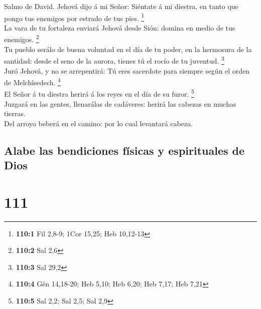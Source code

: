  Salmo de David. Jehová dijo á mi Señor: Siéntate á mi
diestra, en tanto que pongo tus enemigos por estrado de tus pies.
\footnote{\textbf{110:1} Fil 2,8-9; 1Cor 15,25; Heb 10,12-13}\\
 La vara de tu fortaleza enviará Jehová desde Sión: domina
en medio de tus enemigos. \footnote{\textbf{110:2} Sal 2,6}\\
 Tu pueblo serálo de buena voluntad en el día de tu poder,
en la hermosura de la santidad: desde el seno de la aurora, tienes tú el
rocío de tu juventud. \footnote{\textbf{110:3} Sal 29,2}\\
 Juró Jehová, y no se arrepentirá: Tú eres sacerdote para
siempre según el orden de Melchîsedech. \footnote{\textbf{110:4} Gén
  14,18-20; Heb 5,10; Heb 6,20; Heb 7,17; Heb 7,21}\\
 El Señor á tu diestra herirá á los reyes en el día de su
furor. \footnote{\textbf{110:5} Sal 2,2; Sal 2,5; Sal 2,9}\\
 Juzgará en las gentes, llenarálas de cadáveres: herirá las
cabezas en muchas tierras.\\
 Del arroyo beberá en el camino: por lo cual levantará
cabeza.

\hypertarget{alabe-las-bendiciones-fuxedsicas-y-espirituales-de-dios}{%
\subsection{Alabe las bendiciones físicas y espirituales de
Dios}\label{alabe-las-bendiciones-fuxedsicas-y-espirituales-de-dios}}

\hypertarget{section-110}{%
\section{111}\label{section-110}}

